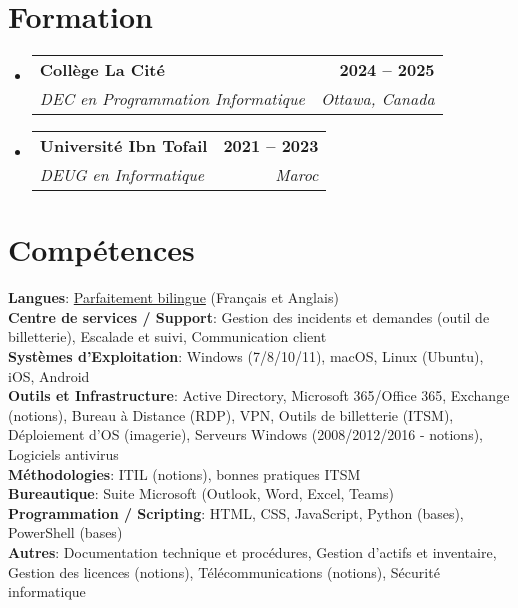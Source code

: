 \documentclass[letterpaper,11pt]{article}
\makeatletter
\newcommand{\resumeSubheading}[4]{
  \vspace{-2pt}\item
    \begin{tabular*}{1.0\textwidth}[t]{l@{\extracolsep{\fill}}r}
      \textbf{#1} & \textbf{\small #2} \\
      \textit{\small#3} & \textit{\small #4} \\
    \end{tabular*}\vspace{-7pt}
}
\newcommand{\resumeSubHeadingListStart}{\begin{itemize}[leftmargin=0.0in, label={}]}
\newcommand{\resumeSubHeadingListEnd}{\end{itemize}}\vspace{0pt}
\makeatother
\begin{document}
\section{Formation}\vspace{1mm}
  \resumeSubHeadingListStart
    \resumeSubheading
      {Collège La Cité}{2024 -- 2025}
      {DEC en Programmation Informatique}{Ottawa, Canada}
    \resumeSubheading
      {Université Ibn Tofail}{2021 -- 2023}
      {DEUG en Informatique}{Maroc}
  \resumeSubHeadingListEnd
    \vspace{-12pt}
\section{Compétences}
 \begin{itemize}[leftmargin=0.15in, label={}]
    \small{\item{   
     \textbf{Langues}{: \underline{Parfaitement bilingue} (Français et Anglais)} \\[0.5mm]
     \textbf{Centre de services / Support}{: Gestion des incidents et demandes (outil de billetterie), Escalade et suivi, Communication client} \\[0.5mm]
     \textbf{Systèmes d'Exploitation}{: Windows (7/8/10/11), macOS, Linux (Ubuntu), iOS, Android} \\[0.5mm]
     \textbf{Outils et Infrastructure}{: Active Directory, Microsoft 365/Office 365, Exchange (notions), Bureau à Distance (RDP), VPN, Outils de billetterie (ITSM), Déploiement d'OS (imagerie), Serveurs Windows (2008/2012/2016 - notions), Logiciels antivirus} \\[0.5mm]
     \textbf{Méthodologies}{: ITIL (notions), bonnes pratiques ITSM} \\[0.5mm]
     \textbf{Bureautique}{: Suite Microsoft (Outlook, Word, Excel, Teams)} \\[0.5mm]
     \textbf{Programmation / Scripting}{: HTML, CSS, JavaScript, Python (bases), PowerShell (bases)} \\[0.5mm]
     \textbf{Autres}{: Documentation technique et procédures, Gestion d'actifs et inventaire, Gestion des licences (notions), Télécommunications (notions), Sécurité informatique} \\ [0.5mm]
    }}
 \end{itemize}
 \vspace{-16pt}

\end{document}
